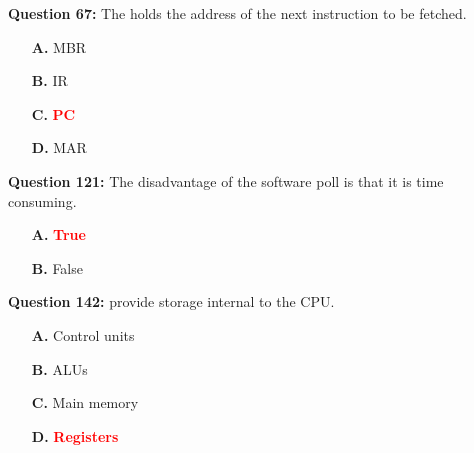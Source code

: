 \documentclass[12pt,a4paper]{article}
\begin{document}
\vspace{0.5cm}

\vspace{0.5cm}

\textbf{Question 67:} The \underline{\hspace{1.5cm}} holds the address of the next instruction to be fetched.

\begin{itemize}
    \item[\textbf{A.}] MBR
    \item[\textbf{B.}] IR
    \item[\textbf{C.}] \textcolor{red}{\textbf{PC}}
    \item[\textbf{D.}] MAR
\end{itemize}

\vspace{0.5cm}

\vspace{0.5cm}

\vspace{0.5cm}

\vspace{0.5cm}

\vspace{0.5cm}

\vspace{0.5cm}

\textbf{Question 121:} The disadvantage of the software poll is that it is time consuming.

\begin{itemize}
    \item[\textbf{A.}] \textcolor{red}{\textbf{True}}
    \item[\textbf{B.}] False
\end{itemize}

\vspace{0.5cm}

\vspace{0.5cm}

\vspace{0.5cm}

\vspace{0.5cm}

\textbf{Question 142:} \underline{\hspace{1.5cm}} provide storage internal to the CPU.

\begin{itemize}
    \item[\textbf{A.}] Control units
    \item[\textbf{B.}] ALUs
    \item[\textbf{C.}] Main memory
    \item[\textbf{D.}] \textcolor{red}{\textbf{Registers}}
\end{itemize}
\end{document}
